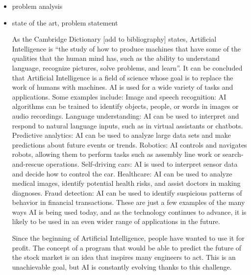 \documentclass[a4paper,twoside,12pt]{book}
\begin{document}
\begin{itemize}
\item  problem analysis
\item state of the art, problem statement

As the Cambridge Dictionary [add to bibliography] states, Artificial Intelligence is “the study of how to produce machines that have some of the qualities that the human mind has, such as the ability to understand language, recognize pictures, solve problems, and learn”. It can be concluded that Artificial Intelligence is a field of science whose goal is to replace the work of humans with machines.
AI is used for a wide variety of tasks and applications. Some examples include:
Image and speech recognition: AI algorithms can be trained to identify objects, people, or words in images or audio recordings.
Language understanding: AI can be used to interpret and respond to natural language inputs, such as in virtual assistants or chatbots.
Predictive analytics: AI can be used to analyze large data sets and make predictions about future events or trends.
Robotics: AI controls and navigates robots, allowing them to perform tasks such as assembly line work or search-and-rescue operations.
Self-driving cars: AI is used to interpret sensor data and decide how to control the car.
Healthcare: AI can be used to analyze medical images, identify potential health risks, and assist doctors in making diagnoses.
Fraud detection: AI can be used to identify suspicious patterns of behavior in financial transactions.
These are just a few examples of the many ways AI is being used today, and as the technology continues to advance, it is likely to be used in an even wider range of applications in the future.

Since the beginning of Artificial Intelligence, people have wanted to use it for profit. The concept of a program that would be able to predict the future of the stock market is an idea that inspires many engineers to act. This is an unachievable goal, but AI is constantly evolving thanks to this challenge.


\end{itemize}
\end{document}

